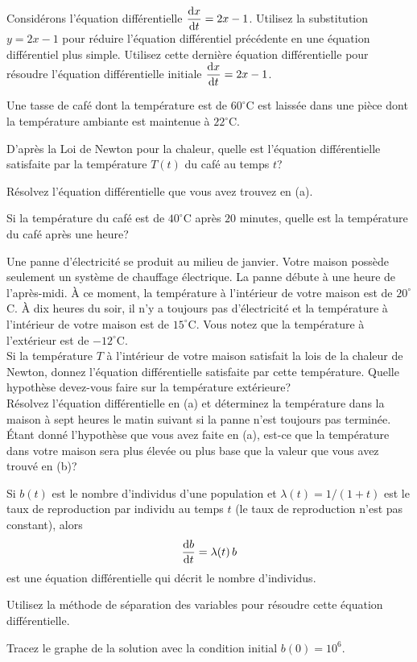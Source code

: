 \begin{question}
Considérons l'équation différentielle $\displaystyle \frac{\mathrm{d}x}{\mathrm{d}t} = 2x-1$.
Utilisez la substitution $y=2x-1$ pour réduire l'équation différentiel
précédente en une équation différentiel plus simple.  Utilisez cette dernière
équation différentielle pour résoudre l'équation différentielle initiale
$\displaystyle \frac{\mathrm{d}x}{\mathrm{d}t} = 2x-1$.
\label{10Q32}
\end{question}

\begin{question}
Une tasse de café dont la température est de $60^\circ$C est laissée dans une
pièce dont la température ambiante est maintenue à $22^\circ$C.

 D'après la Loi de Newton pour la chaleur, quelle est l'équation
différentielle satisfaite par la température $T(t)$ du café au temps $t$?

 Résolvez l'équation différentielle que vous avez trouvez en (a).

 Si la température du café est de $40^\circ$C après $20$ minutes,
quelle est la température du café après une heure?
\label{10Q33}
\end{question}

\begin{question}
Une panne d'électricité se produit au milieu de janvier.  Votre maison
possède seulement un système de chauffage électrique.  La panne
débute à une heure de l'après-midi.  À ce moment, la température à
l'intérieur de votre maison est de $20^\circ$C.  À dix heures du soir,
il n'y a toujours pas d'électricité et la température à l'intérieur de
votre maison est de $15^\circ$C.  Vous notez que la température à
l'extérieur est de $-12^\circ$C.\\
 Si la température $T$ à l'intérieur de votre
maison satisfait la lois de la chaleur de Newton, donnez l'équation
différentielle satisfaite par cette température.  Quelle hypothèse
devez-vous faire sur la température extérieure?\\
 Résolvez l'équation différentielle en (a) et déterminez la
température dans la maison à sept heures le matin suivant si la
panne n'est toujours pas terminée.\\
 Étant donné l'hypothèse que vous avez faite en (a), est-ce
que la température dans votre maison sera plus élevée ou plus
base que la valeur que vous avez trouvé en (b)?
\label{10Q34}
\end{question}

\begin{question}[\life]
Si $b(t)$ est le nombre d'individus d'une population et
$\lambda(t) = 1/(1+t)$ est le taux de reproduction par individu  au
temps $t$ (le taux de reproduction n'est pas constant), alors
\[
\frac{\mathrm{d}b}{\mathrm{d}t} = \lambda(t)\,b 
\]
est une équation différentielle qui décrit le nombre d'individus.

 Utilisez la méthode de séparation des variables pour résoudre cette
équation différentielle.

 Tracez le graphe de la solution avec la condition initial
$b(0)=10^6$.
\label{10Q35}
\end{question}

